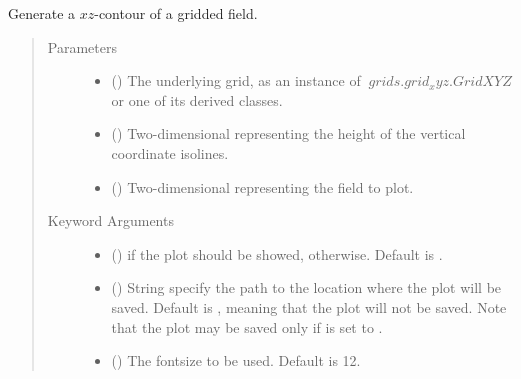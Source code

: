 \documentclass[letterpaper,10pt,english]{sphinxmanual}
\begin{document}
\begin{fulllineitems}
\label{\detokenize{api:utils.utils_plot.contour_xz}}
Generate a \(xz\)-contour of a gridded field.
\begin{quote}\begin{description}
\item[{Parameters}] \leavevmode\begin{itemize}
\item {} 
 () \textendash{} The underlying grid, as an instance of \(~grids.grid_xyz.GridXYZ\) or one of its derived classes.

\item {} 
 () \textendash{} Two-dimensional  representing the height of the vertical coordinate isolines.

\item {} 
 () \textendash{} Two-dimensional  representing the field to plot.

\end{itemize}

\item[{Keyword Arguments}] \leavevmode\begin{itemize}
\item {} 
 () \textendash{}  if the plot should be showed,  otherwise. Default is .

\item {} 
 () \textendash{} String specify the path to the location where the plot will be saved. Default is , meaning that the plot
will not be saved. Note that the plot may be saved only if  is set to .

\item {} 
 () \textendash{} The fontsize to be used. Default is 12.


\end{itemize}
\end{description}
\end{quote}
\end{fulllineitems}
\end{document}
